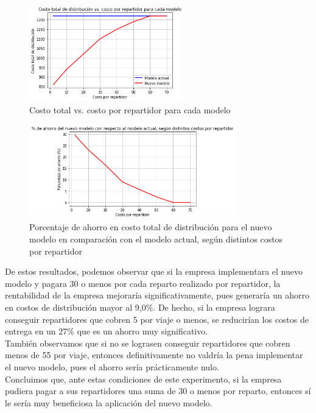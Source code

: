 \documentclass{article}
\begin{document}
\begin{figure}[H] 
    \centering
    \includegraphics[width=0.6\textwidth]{costo_tot_vs_costo_rep.png}
    \caption{Costo total vs. costo por repartidor para cada modelo}
    \label{fig:mi-imagen}
\end{figure}


\begin{figure}[H] 
    \centering
    \includegraphics[width=0.8\textwidth]{porcentaje_ahorro_vs_costo_rep.png}
    \caption{Porcentaje de ahorro en costo total de distribución para el nuevo modelo en comparación con el modelo actual, según distintos costos por repartidor}
    \label{fig:mi-imagen}
\end{figure}

De estos resultados, podemos observar que si la empresa implementara el nuevo modelo y pagara 30 o menos por cada reparto realizado por repartidor, la rentabilidad de la empresa mejoraría significativamente, pues generaría un ahorro en costos de distribución mayor al 9,0\%. De hecho, si la empresa lograra conseguir repartidores que cobren 5 por viaje o menos, se reducirían los costos de entrega en un 27\% que es un ahorro muy significativo. \\
También observamos que si no se lograsen conseguir repartidores que cobren menos de 55 por viaje, entonces definitivamente no valdría la pena implementar el nuevo modelo, pues el ahorro sería prácticamente nulo. \\
Concluimos que, ante estas condiciones de este experimento, si la empresa pudiera pagar a sus repartidores una suma de 30 o menos por reparto, entonces sí le sería muy beneficiosa la aplicación del nuevo modelo. 
\end{document}
